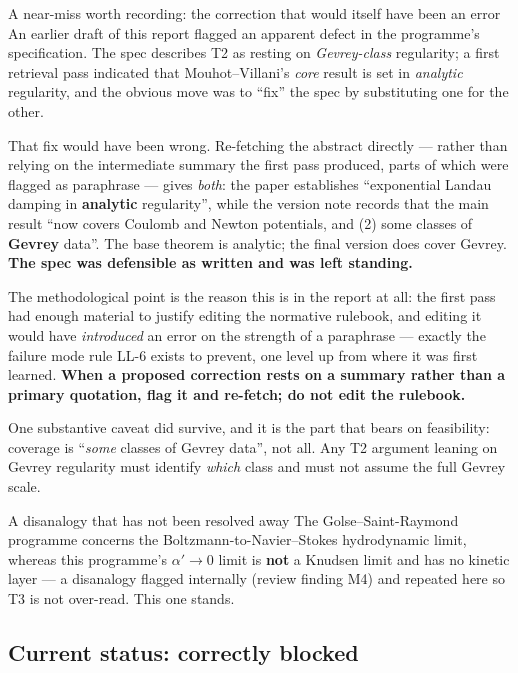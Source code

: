 \documentclass[11pt,a4paper]{article}
\theoremstyle{definition}
\theoremstyle{plain}
\begin{document}
\begin{keybox}{A near-miss worth recording: the correction that would itself have been an error}
An earlier draft of this report flagged an apparent defect in the programme's specification.
The spec describes T2 as resting on \emph{Gevrey-class} regularity; a first retrieval pass
indicated that Mouhot--Villani's \emph{core} result is set in \emph{analytic} regularity, and
the obvious move was to ``fix'' the spec by substituting one for the other.

That fix would have been wrong. Re-fetching the abstract directly --- rather than relying on
the intermediate summary the first pass produced, parts of which were flagged as paraphrase
--- gives \emph{both}: the paper establishes ``exponential Landau damping in \textbf{analytic}
regularity'', while the version note records that the main result ``now covers Coulomb and
Newton potentials, and (2) some classes of \textbf{Gevrey} data''. The base theorem is
analytic; the final version does cover Gevrey. \textbf{The spec was defensible as written and
was left standing.}

The methodological point is the reason this is in the report at all: the first pass had enough
material to justify editing the normative rulebook, and editing it would have \emph{introduced}
an error on the strength of a paraphrase --- exactly the failure mode rule LL-6 exists to
prevent, one level up from where it was first learned. \textbf{When a proposed correction rests
on a summary rather than a primary quotation, flag it and re-fetch; do not edit the rulebook.}

One substantive caveat did survive, and it is the part that bears on feasibility: coverage is
``\emph{some} classes of Gevrey data'', not all. Any T2 argument leaning on Gevrey regularity
must identify \emph{which} class and must not assume the full Gevrey scale.
\end{keybox}

\begin{warnbox}{A disanalogy that has not been resolved away}
The Golse--Saint-Raymond programme \cite{golse-saintraymond} concerns the
Boltzmann-to-Navier--Stokes hydrodynamic limit, whereas this programme's $\alpha'\to0$ limit
is \textbf{not} a Knudsen limit and has no kinetic layer --- a disanalogy flagged internally
(review finding M4) and repeated here so T3 is not over-read. This one stands.
\end{warnbox}

\subsection{Current status: correctly blocked}
\end{document}
